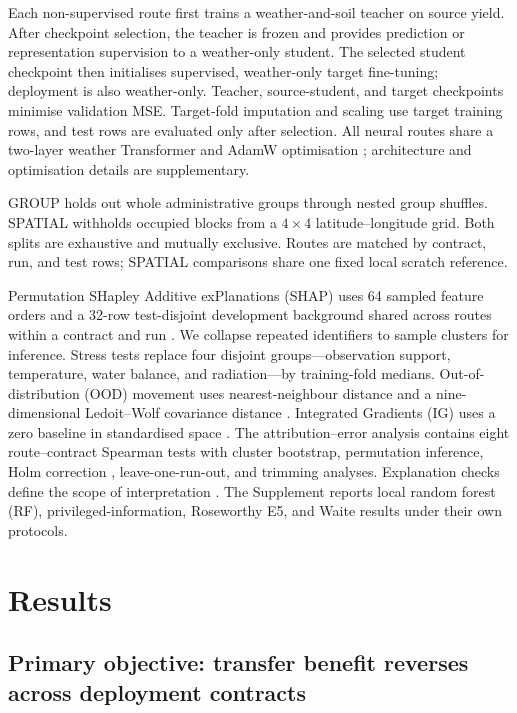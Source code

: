 \documentclass[runningheads]{venue/lncs/llncs}
\newcommand{\group}{\textsc{GROUP}}
\newcommand{\spatial}{\textsc{SPATIAL}}
\begin{document}
Each non-supervised route first trains a weather-and-soil teacher on source yield. After checkpoint selection, the teacher is frozen and provides prediction or representation supervision to a weather-only student. The selected student checkpoint then initialises supervised, weather-only target fine-tuning; deployment is also weather-only. Teacher, source-student, and target checkpoints minimise validation MSE. Target-fold imputation and scaling use target training rows, and test rows are evaluated only after selection. All neural routes share a two-layer weather Transformer and AdamW optimisation \cite{Loshchilov2019AdamW,Vaswani2017Transformer}; architecture and optimisation details are supplementary.

\group{} holds out whole administrative groups through nested group shuffles. \spatial{} withholds occupied blocks from a $4\times4$ latitude--longitude grid. Both splits are exhaustive and mutually exclusive. Routes are matched by contract, run, and test rows; SPATIAL comparisons share one fixed local scratch reference.

Permutation SHapley Additive exPlanations (SHAP) uses 64 sampled feature orders and a 32-row test-disjoint development background shared across routes within a contract and run \cite{Aas2021DependentSHAP,Lundberg2017SHAP}. We collapse repeated identifiers to sample clusters for inference. Stress tests replace four disjoint groups---observation support, temperature, water balance, and radiation---by training-fold medians. Out-of-distribution (OOD) movement uses nearest-neighbour distance and a nine-dimensional Ledoit--Wolf covariance distance \cite{LedoitWolf2004}. Integrated Gradients (IG) uses a zero baseline in standardised space \cite{Sundararajan2017IntegratedGradients}. The attribution--error analysis contains eight route--contract Spearman tests with cluster bootstrap, permutation inference, Holm correction \cite{Holm1979}, leave-one-run-out, and trimming analyses. Explanation checks define the scope of interpretation \cite{Adebayo2018SanityChecks,Hooker2019ROAR}. The Supplement reports local random forest (RF), privileged-information, Roseworthy E5, and Waite results under their own protocols.

\section{Results}

\subsection{Primary objective: transfer benefit reverses across deployment contracts}
\end{document}
